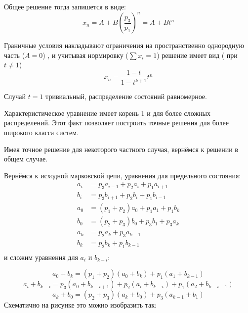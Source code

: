 Общее решение тогда запишется в виде:
   \[ x_n = A + B\left(\frac{p_3}{p_1} \right)^n=A+B t^n\]

Граничные условия накладывают ограничения на пространственно однородную часть ($A=0$) , и учитывая нормировку ($\sum x_i=1$) решение имеет вид ( при $t\neq 1$)
\begin{equation}
\label{sol}
x_n = \frac{1-t}{1-t^{k+1}} t^n
\end{equation}

Случай $t=1$ тривиальный, распределение состояний равномерное.
\begin{zam}
	Характеристическое уравнение имеет корень $1$ и для более сложных распределений. Этот факт позволяет построить точные решения для более широкого класса систем.
\end{zam}

Имея точное решение для некоторого частного случая, вернёмся к решении в общем случае.
\newtheorem*{hyp}{Гипотеза}

Вернёмся к исходной марковской цепи, уравнения для предельного состояния:
\begin{align*}
a_i &= p_3 a_{i-1} + p_2 a_i + p_1 a_{i+1}\\
b_i &= p_3 b_{i+1} + p_2 b_i + p_1 b_{i-1}\\
a_0 &= (p_1 + p_2) a_0 + p_1 a_1 + p_1 b_k\\
b_0 &= (p_2 + p_3) b_0 + p_3 b_1 + p_3 a_k \\
a_k &= p_2 a_k + p_3 a_{k-1}\\
b_k &= p_2 b_k + p_1 b_{k-1}\\
\end{align*}
и сложим уравнения для $a_i$ и $b_{k-i}$:
\vspace{1cm}

		\[
a_0+b_{k} = (p_1 + p_2) (a_0 +b_k)  + p_1 (a_1 + b_{k-1})
\]
\[
a_i + b _{k-i} = p_3 (a_0 + b_{k-i+1}) + p_2 (a_i + b_{k-i}) + p_1 (a_2 + b_{k-i-1})
\]
\[
a_k + b_0 = (p_2 + p_3) (a_k + b_0) +p_3(a_{k-1}+b_1)
\]
Схематично на рисунке это можно изобразить так:

